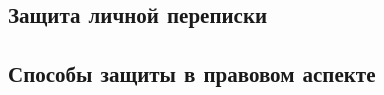 \parindent=1cm %
\begin{center}
		
		\section{Защита личной переписки}
		
\end{center}

\subsection{Способы защиты в правовом аспекте}

\newpage 
